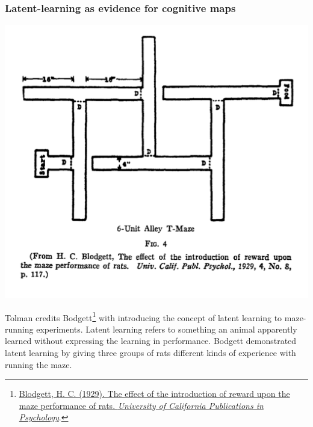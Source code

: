 \documentclass[
  oneside,
  12pt]{crumpbook}
\newenvironment{floatrightbox25}{%
  \wrapfigure{R}{.25\textwidth}%
  }{%
  \endwrapfigure}
\begin{document}
\hypertarget{latent-learning-as-evidence-for-cognitive-maps}{%
\subsubsection{Latent-learning as evidence for cognitive maps}\label{latent-learning-as-evidence-for-cognitive-maps}}

\begin{floatrightbox25}
\includegraphics[width=1\linewidth]{imgs/Tolman_latentmap}

\end{floatrightbox25}

Tolman credits Bodgett\footnote{\protect\hyperlink{ref-blodgettEffectIntroductionReward1929}{Blodgett, H. C. (1929). The effect of the introduction of reward upon the maze performance of rats. \emph{University of California Publications in Psychology}}.} with introducing the concept of latent learning to maze-running experiments. Latent learning refers to something an animal apparently learned without expressing the learning in performance. Bodgett demonstrated latent learning by giving three groups of rats different kinds of experience with running the maze.
\end{document}
